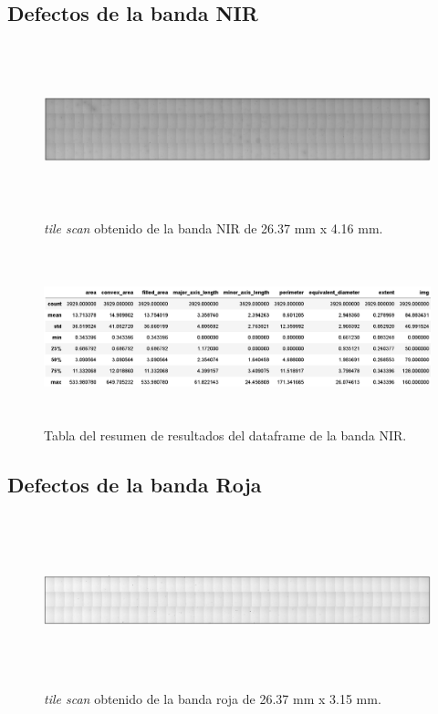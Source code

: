 \singlespacing
\subsection{Defectos de la banda NIR}


\begin{figure}[H]
	\centering
	\includegraphics[width=1.0\textwidth,height= 5.0cm]{Figs/resultados_defectos/banda_nir.png}
	\caption{\textit{tile scan} obtenido de la banda NIR de 26.37 mm x 4.16 mm.}
	\label{fig:bgcel}
\end{figure}


\begin{figure}[H]
	\centering
	\includegraphics[width=1.0\textwidth,height= 5.0cm]{Figs/resultados_defectos/tabla_nir.png}
	\caption{Tabla del resumen de resultados del dataframe de la banda NIR.}
	\label{fig:bgcel}
\end{figure}

\singlespacing
\subsection{Defectos de la banda Roja}


\begin{figure}[H]
	\centering
	\includegraphics[width=1.0\textwidth,height= 5.0cm]{Figs/resultados_defectos/banda_roja.png}
	\caption{\textit{tile scan} obtenido de la banda roja de 26.37 mm x 3.15 mm.}
	\label{fig:bgcel}
\end{figure}


